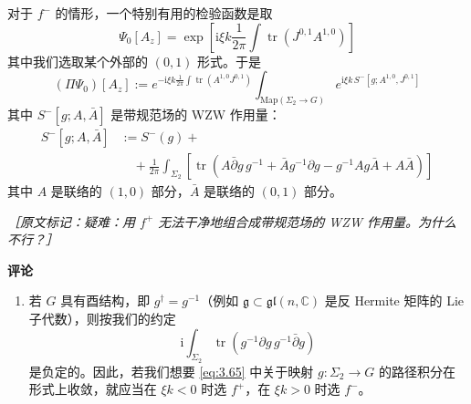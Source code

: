 对于 $f^{-}$ 的情形，一个特别有用的检验函数是取
\begin{equation}
  \Psi_{0}[A_{z}]=\exp\left[\mathrm{i}\xi k\frac{1}{2\pi}\int\operatorname{tr}\left(J^{0,1}A^{1,0}\right)\right]
  \tag{3.66}
  \label{eq:3.66}
\end{equation}
其中我们选取某个外部的 $(0,1)$ 形式。于是
\begin{equation}
  (\Pi\Psi_{0})[A_{z}]:=e^{-\mathrm{i}\xi k\frac{1}{2\pi}\int\operatorname{tr}\left(A^{1,0}J^{0,1}\right)}\int_{\mathrm{Map}(\Sigma_2\to G)}e^{\mathrm{i}\xi k\,S^{-}[g;A^{1,0},J^{0,1}]}
  \tag{3.67}
  \label{eq:3.67}
\end{equation}
其中 $S^{-}[g;A,\bar A]$ 是带规范场的 WZW 作用量：
\begin{equation}
  \begin{aligned}
    S^{-}[g;A,\bar A]&:=S^{-}(g)+\\
    &\quad+\frac{1}{2\pi}\int_{\Sigma_2}\left[\operatorname{tr}\left(A\bar\partial g\,g^{-1}+\bar A g^{-1}\partial g-g^{-1}Ag\bar A+A\bar A\right)\right]
  \end{aligned}
  \tag{3.68}
  \label{eq:3.68}
\end{equation}
其中 $A$ 是联络的 $(1,0)$ 部分，$\bar A$ 是联络的 $(0,1)$ 部分。

{\small\itshape ［原文标记：疑难：用 $f^{+}$ 无法干净地组合成带规范场的 WZW 作用量。为什么不行？］}

\textbf{评论}

\begin{enumerate}
  \item 若 $G$ 具有酉结构，即 $g^{\dagger}=g^{-1}$（例如 $\mathfrak{g}\subset\mathfrak{gl}(n,\mathbb{C})$ 是反 Hermite 矩阵的 Lie 子代数），则按我们的约定
\begin{equation}
  \mathrm{i}\int_{\Sigma_2}\operatorname{tr}\left(g^{-1}\partial g\,g^{-1}\bar\partial g\right)
  \tag{3.69}
  \label{eq:3.69}
\end{equation}
  是负定的。因此，若我们想要 \eqref{eq:3.65} 中关于映射 $g:\Sigma_2\to G$ 的路径积分在形式上收敛，就应当在 $\xi k<0$ 时选 $f^{+}$，在 $\xi k>0$ 时选 $f^{-}$。
\end{enumerate}
